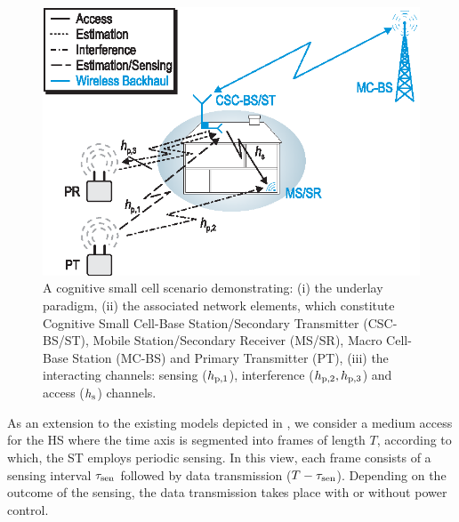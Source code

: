 \begin{figure}[!t]
\centering
\includegraphics[width = \figscalet]{figures/CR_Scenario_Hybrid}
\caption{A cognitive small cell scenario demonstrating: (i) the underlay paradigm, (ii) the associated network elements, which constitute Cognitive Small Cell-Base Station/Secondary Transmitter (CSC-BS/ST), Mobile Station/Secondary Receiver (MS/SR), Macro Cell-Base Station (MC-BS) and Primary Transmitter (PT), (iii) the interacting channels: sensing ($h_{\text{p,1}}$), interference ($h_{\text{p,2}}, h_{\text{p,3}}$) and access ($h_{\text{s}}$) channels.}
\label{fig:scenario}
\end{figure}

As an extension to the existing models depicted in \cite{Kang09, Sharma14}, we consider a medium access for the HS where the time axis is segmented into frames of length $T$, according to which, the ST employs periodic sensing. In this view, each frame consists of a sensing interval $\tau_{\text{sen}}$ followed by data transmission ($T - \tau_{\text{sen}}$). Depending on the outcome of the sensing, the data transmission takes place  with or without power control. 

